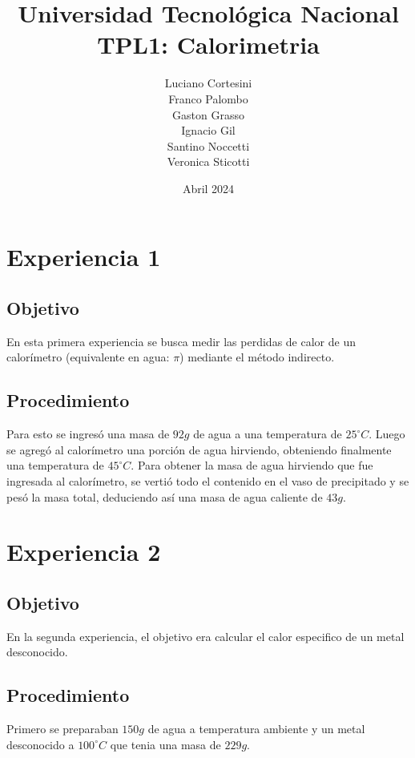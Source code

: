 \documentclass[12pt]{report}
\title{Universidad Tecnológica Nacional\\TPL1: Calorimetria}
\author{
Luciano Cortesini\\
Franco Palombo\\
Gaston Grasso\\
Ignacio Gil\\
Santino Noccetti\\
Veronica Sticotti
}
\date{Abril 2024}
\begin{document}
\maketitle

\chapter{Experiencia 1}
\section{Objetivo}
En esta primera experiencia se busca medir las perdidas de calor de un calorímetro (equivalente en agua: $\pi$) mediante el método indirecto. 

\section{Procedimiento}
Para esto se ingresó una masa de $92 g$ de agua a una temperatura de $25^\circ C$.
Luego se agregó al calorímetro una porción de agua hirviendo, obteniendo finalmente una temperatura de  $45^\circ C$. 
Para obtener la masa de agua hirviendo que fue ingresada al calorímetro, se vertió todo el contenido en el vaso de precipitado y se pesó la masa total, deduciendo así una masa de agua caliente de $43g$.


\chapter{Experiencia 2}
\section{Objetivo}
En la segunda experiencia, el objetivo era calcular el calor especifico de un metal desconocido.

\section{Procedimiento}
Primero se preparaban $150 g$ de agua a temperatura ambiente y un metal desconocido a $100^\circ C$ que tenia una masa de $229 g$.
\end{document}
